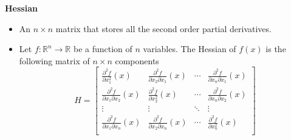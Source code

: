 \documentclass[11pt]{article}
\begin{document}
\textbf{Hessian}
\begin{itemize}
    \item An $n \times n$ matrix that stores all the second order partial derivatives.
    \item Let $f : \mathbb{R}^n \to \mathbb{R}$ be a function of $n$ variables. The Hessian of 
    $f(x)$ is the following matrix of $n \times n$ components
    \[
    H = \begin{bmatrix}
        \frac{\partial^2 f}{\partial x_1^2}(x) & \frac{\partial^2 f}{\partial x_2 \partial x_1}(x) & \cdots & \frac{\partial^2 f}{\partial x_n \partial x_1}(x) \\
        \frac{\partial^2 f}{\partial x_1 \partial x_2}(x) & \frac{\partial^2 f}{\partial x_2^2}(x) & \cdots & \frac{\partial^2 f}{\partial x_n \partial x_2}(x) \\
        \vdots & \vdots & \ddots & \vdots \\
        \frac{\partial^2 f}{\partial x_1 \partial x_n}(x) & \frac{\partial^2 f}{\partial x_2 \partial x_n}(x) & \cdots & \frac{\partial^2 f}{\partial x_n^2}(x) \\
    \end{bmatrix}    
    \]
\end{itemize}
\end{document}
